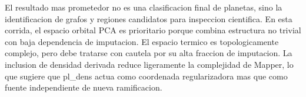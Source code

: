 El resultado mas prometedor no es una clasificacion final de planetas, sino la identificacion de grafos y regiones candidatos para inspeccion cientifica. En esta corrida, el espacio orbital PCA es prioritario porque combina estructura no trivial con baja dependencia de imputacion. El espacio termico es topologicamente complejo, pero debe tratarse con cautela por su alta fraccion de imputacion. La inclusion de densidad derivada reduce ligeramente la complejidad de Mapper, lo que sugiere que pl_dens actua como coordenada regularizadora mas que como fuente independiente de nueva ramificacion.
